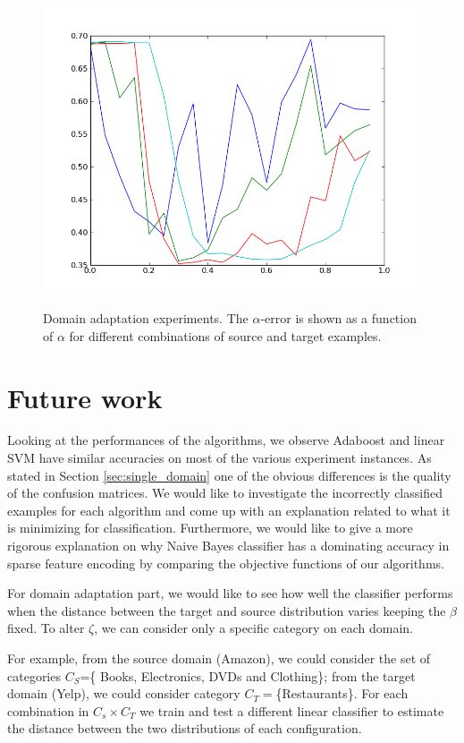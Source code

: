 \documentclass[letterpaper]{article}
\begin{document}
\begin{figure}
  \subfigure%
  {\includegraphics[scale=.3]{adaptation_err_1_T}}
  \caption{Domain adaptation experiments. The $\alpha$-error is shown as a function of $\alpha$ for different combinations of source and target examples.}
  \label{fig:domain-adaptation}
\end{figure}

\section{Future work}
\label{sec:future-work}

Looking at the performances of the algorithms, we observe Adaboost
and linear SVM have similar accuracies on most of the various
experiment instances. As stated in Section \ref{sec:single_domain} one
of the obvious differences is the quality of the confusion matrices. We would like to
investigate the incorrectly classified examples for each algorithm and
come up with an explanation related to what it is minimizing for
classification.  Furthermore, we would like to give a more rigorous explanation on why
Naive Bayes classifier has a dominating accuracy in sparse feature
encoding by comparing the objective functions of our algorithms.

For domain adaptation part, we would like to see how well the classifier
performs when the distance between the target and source distribution
varies keeping the $\beta$ fixed. To alter $\zeta$, we can consider
only a specific category on each domain. 

For example, from the source domain (Amazon), we could consider the
set of categories $C_S$=\{ Books, Electronics, DVDs and Clothing\};
from the target domain (Yelp), we could consider category
$C_T=$\{Restaurants\}. For each combination in $C_s\times C_T$ we
train and test a different linear classifier to estimate the distance
between the two distributions of each configuration.
\end{document}
